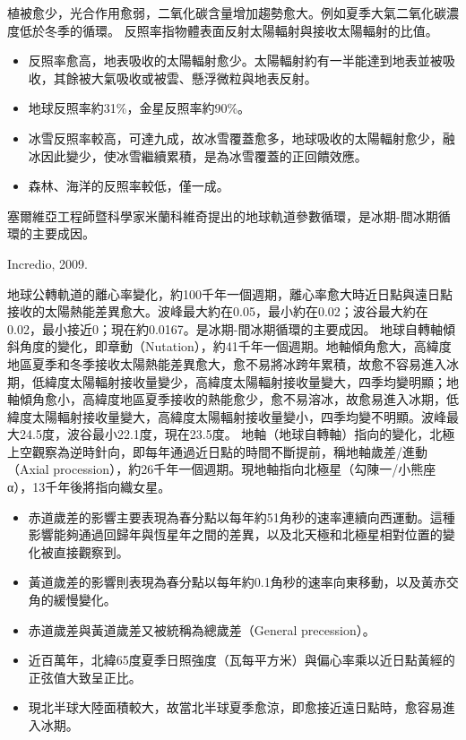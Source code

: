 \documentclass[a4paper,12pt]{report}
\begin{document}
植被愈少，光合作用愈弱，二氧化碳含量增加趨勢愈大。例如夏季大氣二氧化碳濃度低於冬季的循環。
反照率指物體表面反射太陽輻射與接收太陽輻射的比值。
\begin{itemize}
\item 反照率愈高，地表吸收的太陽輻射愈少。太陽輻射約有一半能達到地表並被吸收，其餘被大氣吸收或被雲、懸浮微粒與地表反射。
\item 地球反照率約31\%，金星反照率約90\%。
\item 冰雪反照率較高，可達九成，故冰雪覆蓋愈多，地球吸收的太陽輻射愈少，融冰因此變少，使冰雪繼續累積，是為冰雪覆蓋的正回饋效應。
\item 森林、海洋的反照率較低，僅一成。
\end{itemize}
塞爾維亞工程師暨科學家米蘭科維奇提出的地球軌道參數循環，是冰期-間冰期循環的主要成因。
\bct\bfH\ctr{}\caption{Incredio, 2009.}\ef\FB\ect
{}
地球公轉軌道的離心率變化，約100千年一個週期，離心率愈大時近日點與遠日點接收的太陽熱能差異愈大。波峰最大約在0.05，最小約在0.02；波谷最大約在0.02，最小接近0；現在約0.0167。是冰期-間冰期循環的主要成因。
地球自轉軸傾斜角度的變化，即章動（Nutation），約41千年一個週期。地軸傾角愈大，高緯度地區夏季和冬季接收太陽熱能差異愈大，愈不易將冰跨年累積，故愈不容易進入冰期，低緯度太陽輻射接收量變少，高緯度太陽輻射接收量變大，四季均變明顯；地軸傾角愈小，高緯度地區夏季接收的熱能愈少，愈不易溶冰，故愈易進入冰期，低緯度太陽輻射接收量變大，高緯度太陽輻射接收量變小，四季均變不明顯。波峰最大24.5度，波谷最小22.1度，現在23.5度。
地軸（地球自轉軸）指向的變化，北極上空觀察為逆時針向，即每年通過近日點的時間不斷提前，稱地軸歲差/進動（Axial procession），約26千年一個週期。現地軸指向北極星（勾陳一/小熊座α），13千年後將指向織女星。
\begin{itemize}
\item 赤道歲差的影響主要表現為春分點以每年約51角秒的速率連續向西運動。這種影響能夠通過回歸年與恆星年之間的差異，以及北天極和北極星相對位置的變化被直接觀察到。
\item 黃道歲差的影響則表現為春分點以每年約0.1角秒的速率向東移動，以及黃赤交角的緩慢變化。
\item 赤道歲差與黃道歲差又被統稱為總歲差（General precession）。
\item 近百萬年，北緯65度夏季日照強度（瓦每平方米）與偏心率乘以近日點黃經的正弦值大致呈正比。
\item 現北半球大陸面積較大，故當北半球夏季愈涼，即愈接近遠日點時，愈容易進入冰期。
\end{itemize}
\end{document}
